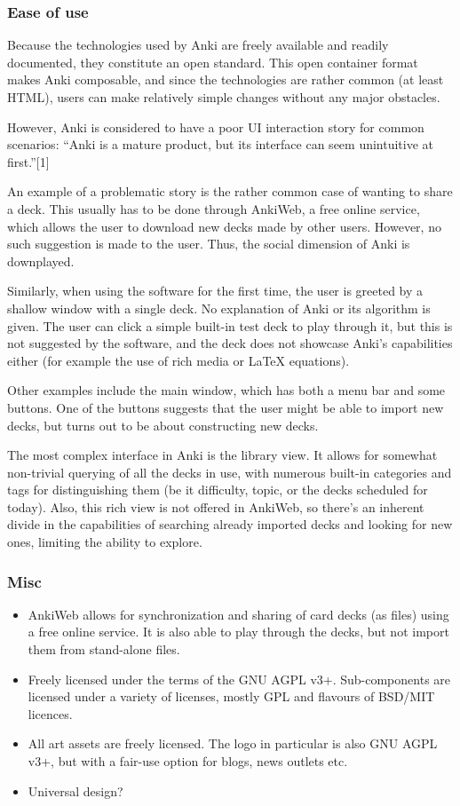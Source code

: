 \subsubsection{Ease of use}

Because the technologies used by Anki are freely available and readily
documented, they constitute an open standard. This open container format makes
Anki composable, and since the technologies are rather common (at least HTML),
users can make relatively simple changes without any major obstacles.

However, Anki is considered to have a poor UI interaction story for common
scenarios: ``Anki is a mature product, but its interface can seem unintuitive 
at first.''[1] %

An example of a problematic story is the rather common case of wanting to share
a deck. This usually has to be done through AnkiWeb, a free online service, 
which allows the user to download new decks made by other users. However, no such
suggestion is made to the user. Thus, the social dimension of Anki is 
downplayed.

Similarly, when using the software for the first time, the user is greeted by 
a shallow window with a single deck. No explanation of Anki or its algorithm 
is given. The user can click a simple built-in test deck to play through it, 
but this is not suggested by the software, and the deck does not showcase 
Anki's capabilities either (for example the use of rich media or LaTeX 
equations).

Other examples include the main window, which has both a menu bar and some
buttons. One of the buttons suggests that the user might be able to import new
decks, but turns out to be about constructing new decks.

The most complex interface in Anki is the library view. It allows for somewhat
non-trivial querying of all the decks in use, with numerous built-in categories
and tags for distinguishing them (be it difficulty, topic, or the decks
scheduled for today). Also, this rich view is not offered in AnkiWeb, so there's
an inherent divide in the capabilities of searching already imported decks and
looking for new ones, limiting the ability to explore.

\subsubsection{Misc}

\begin{itemize}
\item AnkiWeb allows for synchronization and sharing of card decks (as files) using
  a free online service. It is also able to play through the decks, but not
  import them from stand-alone files.
\item Freely licensed under the terms of the GNU AGPL v3+. Sub-components are
  licensed under a variety of licenses, mostly GPL and flavours of BSD/MIT 
  licences.
\item All art assets are freely licensed. The logo in particular is also GNU AGPL
  v3+, but with a fair-use option for blogs, news outlets etc.
\item Universal design? %
\end{itemize}

